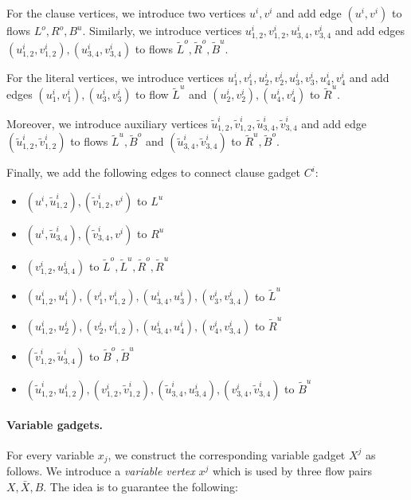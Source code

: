 \documentclass[fontsize=11pt,paper=a4]{book}
\begin{document}
For the clause vertices, we introduce two vertices \(u^i,v^i\) and add edge \((u^i,v^i)\) to flows \(L^o,R^o,B^u\).
Similarly, we introduce vertices \(u_{1,2}^i,v_{1,2}^i,u_{3,4}^i,v_{3,4}^i\) and add edges \((u_{1,2}^i,v_{1,2}^i),(u_{3,4}^i,v_{3,4}^i)\) to flows \(\tilde{L}^o,\tilde{R}^o,\tilde{B}^u\).

For the literal vertices, we introduce vertices \(u_1^i,v_1^i,u_2^i,v_2^i,u_3^i,v_3^i,u_4^i,v_4^i\) and add edges \((u_1^i,v_1^i),(u_3^i,v_3^i)\) to flow \(\tilde{L}^u\) and \((u_2^i,v_2^i),(u_4^i,v_4^i)\) to \(\tilde{R}^u\).

Moreover, we introduce auxiliary vertices \(\tilde{u}_{1,2}^i,\tilde{v}_{1,2}^i,\tilde{u}_{3,4}^i,\tilde{v}_{3,4}^i\) and add edge \((\tilde{u}_{1,2}^i,\tilde{v}_{1,2}^i)\) to flows \(\tilde{L}^u,\tilde{B}^o\) and \((\tilde{u}_{3,4}^i,\tilde{v}_{3,4}^i)\) to \(\tilde{R}^u,\tilde{B}^o\).

Finally, we add the following edges to connect clause gadget \(C^i\):

\begin{itemize}
\item \((u^i,\tilde{u}_{1,2}^i),(\tilde{v}_{1,2}^i,v^i)\) to \(L^u\)
\item \((u^i,\tilde{u}_{3,4}^i),(\tilde{v}_{3,4}^i,v^i)\) to \(R^u\)
\item \((v_{1,2}^i,u_{3,4}^i)\) to \(\tilde{L}^o,\tilde{L}^u,\tilde{R}^o,\tilde{R}^u\)
\item \((u_{1,2}^i,u_1^i),(v_1^i,v_{1,2}^i),(u_{3,4}^i,u_3^i),(v_3^i,v_{3,4}^i)\) to \(\tilde{L}^u\)
\item \((u_{1,2}^i,u_2^i),(v_2^i,v_{1,2}^i),(u_{3,4}^i,u_4^i),(v_4^i,v_{3,4}^i)\) to \(\tilde{R}^u\)
\item \((\tilde{v}_{1,2}^i,\tilde{u}_{3,4}^i)\) to \(\tilde{B}^o,\tilde{B}^u\)
\item \((\tilde{u}_{1,2}^i,u_{1,2}^i),(v_{1,2}^i,\tilde{v}_{1,2}^i),(\tilde{u}_{3,4}^i,u_{3,4}^i),(v_{3,4}^i,\tilde{v}_{3,4}^i)\) to \(\tilde{B}^u\)
\end{itemize}

\paragraph{Variable gadgets.}
For every variable \(x_j\), we construct the corresponding variable gadget \(X^j\) as follows.
We introduce a \emph{variable vertex} \(x^j\) which is used by three flow pairs \(X,\bar{X},B\).
The idea is to guarantee the following:
\end{document}

